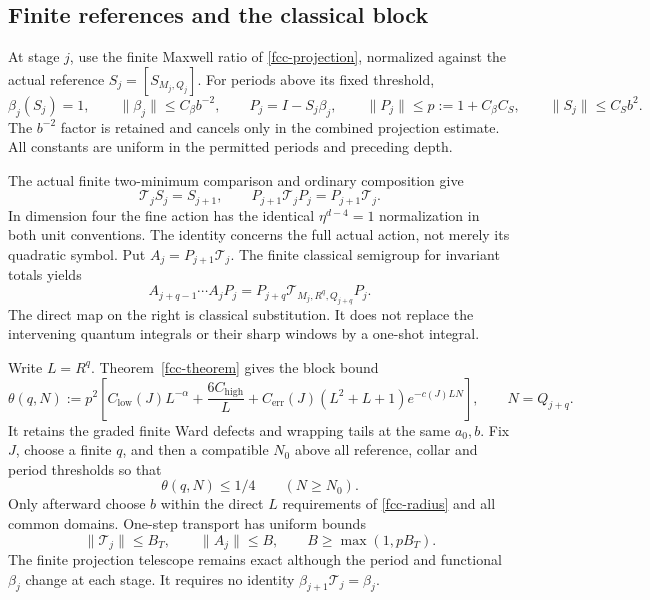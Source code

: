 \documentclass[11pt]{article}
\theoremstyle{remark}
\begin{document}
\subsection{Finite references and the classical block}
\label{fqi-classical-section}

At stage $j$, use the finite Maxwell ratio of
\eqref{fcc-projection}, normalized against the actual reference
$S_j=[S_{M_j,Q_j}]$. For periods above its fixed threshold,
\begin{equation}
 \beta_j(S_j)=1,\qquad
 \|\beta_j\|\le C_\beta b^{-2},\qquad
 P_j=I-S_j\beta_j,\qquad
 \|P_j\|\le p:=1+C_\beta C_S,\qquad
 \|S_j\|\le C_Sb^2.
 \label{fqi-projections}
\end{equation}
The $b^{-2}$ factor is retained and cancels only in the
combined projection estimate. All constants are uniform in
the permitted periods and preceding depth.

The actual finite two-minimum comparison and ordinary
composition give
\begin{equation}
 \mathcal T_jS_j=S_{j+1},\qquad
 P_{j+1}\mathcal T_jP_j=P_{j+1}\mathcal T_j.
 \label{fqi-reference-telescope}
\end{equation}
In dimension four the fine action has the identical
$\eta^{d-4}=1$ normalization in both unit conventions.
The identity concerns the full actual action, not merely
its quadratic symbol. Put $A_j=P_{j+1}\mathcal T_j$.
The finite classical semigroup for invariant totals yields
\begin{equation}
 A_{j+q-1}\cdots A_jP_j
     =P_{j+q}\mathcal T_{M_j,R^q,Q_{j+q}}P_j.
 \label{fqi-block-telescope}
\end{equation}
The direct map on the right is classical substitution.
It does not replace the intervening quantum integrals or
their sharp windows by a one-shot integral.

Write $L=R^q$. Theorem~\ref{fcc-theorem} gives the block bound
\begin{equation}
 \theta(q,N):=p^2\left[
 C_{\mathrm{low}}(J)L^{-\alpha}+\frac{6C_{\mathrm{high}}}L
 +C_{\mathrm{err}}(J)(L^2+L+1)e^{-c(J)LN}\right],
 \qquad N=Q_{j+q}.
 \label{fqi-classical-block-bound}
\end{equation}
It retains the graded finite Ward defects and wrapping tails
at the same $a_0,b$. Fix $J$, choose a finite $q$, and then
a compatible $N_0$ above all reference, collar and period
thresholds so that
\begin{equation}
                 \theta(q,N)\le1/4\qquad(N\ge N_0).
 \label{fqi-period-threshold}
\end{equation}
Only afterward choose $b$ within the direct $L$ requirements
of \eqref{fcc-radius} and all common domains. One-step
transport has uniform bounds
\begin{equation}
 \|\mathcal T_j\|\le B_T,\qquad
 \|A_j\|\le B,\qquad B\ge\max(1,pB_T).
 \label{fqi-one-step-bound}
\end{equation}
The finite projection telescope remains exact although the
period and functional $\beta_j$ change at each stage.
It requires no identity $\beta_{j+1}\mathcal T_j=\beta_j$.
\end{document}
